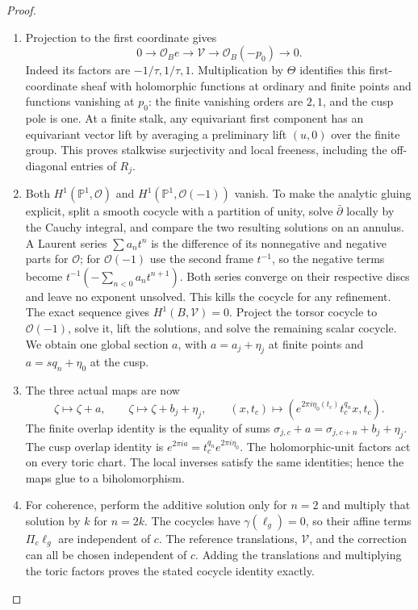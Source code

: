 \begin{proof}
\begin{enumerate}[label=\arabic*.,leftmargin=*]
\item Projection to the first coordinate gives
\[
 0\longrightarrow\mathcal O_Be\longrightarrow\mathcal V
 \longrightarrow\mathcal O_B(-p_0)\longrightarrow0.
\]
Indeed its factors are $-1/\tau,1/\tau,1$. Multiplication by $\Theta$ identifies this first-coordinate sheaf with holomorphic functions at ordinary and finite points and functions vanishing at $p_0$: the finite vanishing orders are $2,1$, and the cusp pole is one. At a finite stalk, any equivariant first component has an equivariant vector lift by averaging a preliminary lift $(u,0)$ over the finite group. This proves stalkwise surjectivity and local freeness, including the off-diagonal entries of $R_j$.

\item Both $H^1(\mathbb P^1,\mathcal O)$ and $H^1(\mathbb P^1,\mathcal O(-1))$ vanish. To make the analytic gluing explicit, split a smooth cocycle with a partition of unity, solve $\bar\partial$ locally by the Cauchy integral, and compare the two resulting solutions on an annulus. A Laurent series $\sum a_nt^n$ is the difference of its nonnegative and negative parts for $\mathcal O$; for $\mathcal O(-1)$ use the second frame $t^{-1}$, so the negative terms become $t^{-1}(-\sum_{n<0}a_nt^{n+1})$. Both series converge on their respective discs and leave no exponent unsolved. This kills the cocycle for any refinement. The exact sequence gives $H^1(B,\mathcal V)=0$. Project the torsor cocycle to $\mathcal O(-1)$, solve it, lift the solutions, and solve the remaining scalar cocycle. We obtain one global section $a$, with $a=a_j+\eta_j$ at finite points and $a=sq_n+\eta_0$ at the cusp.

\item The three actual maps are now
\[
 \zeta\mapsto\zeta+a,\qquad
 \zeta\mapsto\zeta+b_j+\eta_j,\qquad
 (x,t_c)\mapsto(e^{2\pi i\eta_0(t_c)}t_c^{q_n}x,t_c).
\]
The finite overlap identity is the equality of sums
$\sigma_{j,c}+a=\sigma_{j,c+n}+b_j+\eta_j$. The cusp overlap identity is $e^{2\pi ia}=t_c^{q_n}e^{2\pi i\eta_0}$. The holomorphic-unit factors act on every toric chart. The local inverses satisfy the same identities; hence the maps glue to a biholomorphism.

\item For coherence, perform the additive solution only for $n=2$ and multiply that solution by $k$ for $n=2k$. The cocycles have $\gamma(\ell_g)=0$, so their affine terms $\Pi_c\ell_g$ are independent of $c$. The reference translations, $\mathcal V$, and the correction can all be chosen independent of $c$. Adding the translations and multiplying the toric factors proves the stated cocycle identity exactly.


\end{enumerate}
\end{proof}
